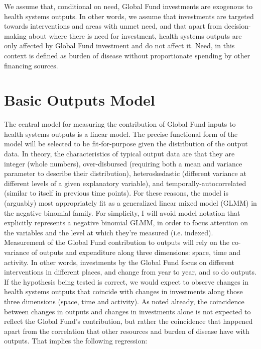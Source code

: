 \documentclass[twocolumn]{bmcart}%
\begin{document}
We assume that, conditional on need, Global Fund investments are exogenous to health systems outputs. In other words, we assume that investments are targeted towards interventions and areas with unmet need, and that apart from decision-making about where there is need for investment, health systems outputs are only affected by Global Fund investment and do not affect it. Need, in this context is defined as burden of disease without proportionate spending by other financing sources.


\section{Basic Outputs Model}

The central model for measuring the contribution of Global Fund inputs to health systems outputs is a linear model. The precise functional form of the model will be selected to be fit-for-purpose given the distribution of the output data. In theory, the characteristics of typical output data are that they are integer (whole numbers), over-disbursed (requiring both a mean and variance parameter to describe their distribution), heteroskedastic (different variance at different levels of a given explanatory variable), and temporally-autocorrelated (similar to itself in previous time points). For these reasons, the model is (arguably) most appropriately fit as a generalized linear mixed model (GLMM) in the negative binomial family. For simplicity, I will avoid model notation that explicitly represents a negative binomial GLMM, in order to focus attention on the variables and the level at which they're measured (i.e. indexed). \\

Measurement of the Global Fund contribution to outputs will rely on the co-variance of outputs and expenditure along three dimensions: space, time and activity. In other words, investments by the Global Fund focus on different interventions in different places, and change from year to year, and so do outputs. If the hypothesis being tested is correct, we would expect to observe changes in health systems outputs that coincide with changes in investments along those three dimensions (space, time and activity). As noted already, the coincidence between changes in outputs and changes in investments alone is not expected to reflect the Global Fund's contribution, but rather the coincidence that happened apart from the correlation that other resources and burden of disease have with outputs. That implies the following regression:
\end{document}
